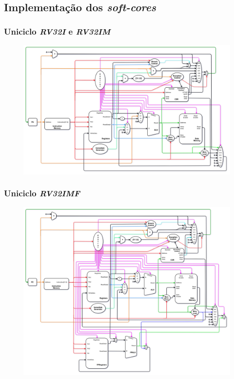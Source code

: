 \documentclass[aspectratio=169]{beamer}
\begin{document}
    \subsection{Implementação dos \textit{soft-cores}}
    \begin{frame}
        \frametitle{Uniciclo \textit{RV32I} e \textit{RV32IM}}
        \vfill
        \begin{figure}[H]
        \centering
            \includegraphics[width=.9\textwidth,height=.85\textheight,keepaspectratio]{../images/uarch_diagrams/singlecycle-RV32I-RV32IM.png}
        \end{figure}
        \vfill
    \end{frame}

    \begin{frame}
        \frametitle{Uniciclo \textit{RV32IMF}}
        \vfill
        \begin{figure}[H]
        \centering
            \includegraphics[width=.9\textwidth,height=.85\textheight,keepaspectratio]{../images/uarch_diagrams/singlecycle-RV32IMF.png}
        \end{figure}
        \vfill
    \end{frame}
\end{document}
